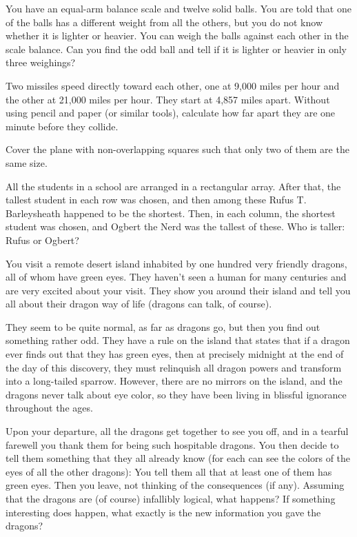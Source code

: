 \documentclass{article}
\begin{document}
\begin{exercise}
    You have an equal-arm balance scale and twelve solid balls. 
    You are told that one of the balls has a different weight from all the others, but you do not know whether it is lighter or heavier. 
    You can weigh the balls against each other in the scale balance. 
    Can you find the odd ball and tell if it is lighter or heavier in only three weighings?
\end{exercise}

\begin{exercise}
    Two missiles speed directly toward each other, one at 9,000 miles per hour and the other at 21,000 miles per hour. 
    They start at 4,857 miles apart. 
    Without using pencil and paper (or similar tools), calculate how far apart they are one minute before they collide.
\end{exercise}

\begin{exercise}
    Cover the plane with non-overlapping squares such that only two of them are the same size.
\end{exercise}

\begin{exercise}
    All the students in a school are arranged in a rectangular array. 
    After that, the tallest student in each row was chosen, and then among these Rufus T. Barleysheath happened to be the shortest. 
    Then, in each column, the shortest student was chosen, and Ogbert the Nerd was the tallest of these. 
    Who is taller: Rufus or Ogbert?
\end{exercise}

\begin{exercise}
    You visit a remote desert island inhabited by one hundred very friendly dragons, all of whom have green eyes. 
    They haven't seen a human for many centuries and are very excited about your visit. They show you around their island and tell you all about their dragon way of life (dragons can talk, of course).
    
    They seem to be quite normal, as far as dragons go, but then you find out something rather odd. They have a rule on the island that states that if a dragon ever finds out that they has green eyes, then at precisely midnight at the end of the day of this discovery, they must relinquish all dragon powers and transform into a long-tailed sparrow. 
    However, there are no mirrors on the island, and the dragons never talk about eye color, so they have been living in blissful ignorance throughout the ages.

    Upon your departure, all the dragons get together to see you off, and in a tearful farewell you thank them for being such hospitable dragons. 
    You then decide to tell them something that they all already know (for each can see the colors of the eyes of all the other dragons): You tell them all that at least one of them has green eyes. Then you leave, not thinking of the consequences (if any). 
    Assuming that the dragons are (of course) infallibly logical, what happens? 
    If something interesting does happen, what exactly is the new information you gave the dragons?
\end{exercise}
\end{document}
